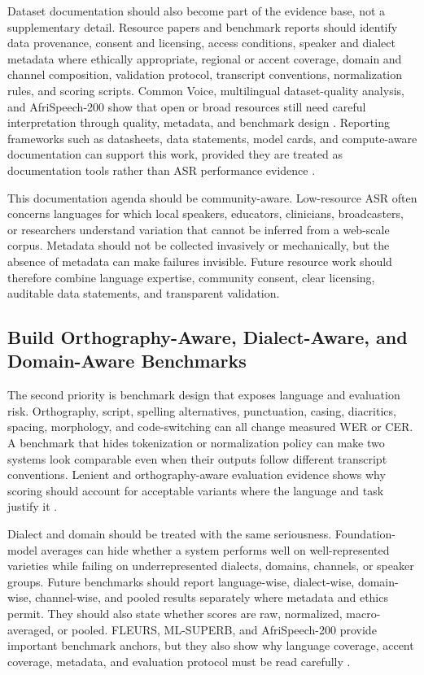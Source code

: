 \documentclass[pdflatex,sn-basic]{sn-jnl}
\theoremstyle{thmstyleone}
\theoremstyle{thmstyletwo}
\theoremstyle{thmstylethree}
\begin{document}
Dataset documentation should also become part of the evidence base, not a supplementary detail. Resource papers and benchmark reports should identify data provenance, consent and licensing, access conditions, speaker and dialect metadata where ethically appropriate, regional or accent coverage, domain and channel composition, validation protocol, transcript conventions, normalization rules, and scoring scripts. Common Voice, multilingual dataset-quality analysis, and AfriSpeech-200 show that open or broad resources still need careful interpretation through quality, metadata, and benchmark design \citep{ardila2020commonvoice,lau2025_data_quality_multilingual_speech,olatunji2023_afrispeech200}. Reporting frameworks such as datasheets, data statements, model cards, and compute-aware documentation can support this work, provided they are treated as documentation tools rather than ASR performance evidence \citep{gebru2021_datasheets_for_datasets,bender2018_data_statements,mitchell2019_model_cards,strubell2019_energy_policy}.

This documentation agenda should be community-aware. Low-resource ASR often concerns languages for which local speakers, educators, clinicians, broadcasters, or researchers understand variation that cannot be inferred from a web-scale corpus. Metadata should not be collected invasively or mechanically, but the absence of metadata can make failures invisible. Future resource work should therefore combine language expertise, community consent, clear licensing, auditable data statements, and transparent validation.

\subsection{Build Orthography-Aware, Dialect-Aware, and Domain-Aware Benchmarks}

The second priority is benchmark design that exposes language and evaluation risk. Orthography, script, spelling alternatives, punctuation, casing, diacritics, spacing, morphology, and code-switching can all change measured WER or CER. A benchmark that hides tokenization or normalization policy can make two systems look comparable even when their outputs follow different transcript conventions. Lenient and orthography-aware evaluation evidence shows why scoring should account for acceptable variants where the language and task justify it \citep{karita2023lenient}.

Dialect and domain should be treated with the same seriousness. Foundation-model averages can hide whether a system performs well on well-represented varieties while failing on underrepresented dialects, domains, channels, or speaker groups. Future benchmarks should report language-wise, dialect-wise, domain-wise, channel-wise, and pooled results separately where metadata and ethics permit. They should also state whether scores are raw, normalized, macro-averaged, or pooled. FLEURS, ML-SUPERB, and AfriSpeech-200 provide important benchmark anchors, but they also show why language coverage, accent coverage, metadata, and evaluation protocol must be read carefully \citep{conneau2022fleurs,shi2023mlsuperb,olatunji2023_afrispeech200}.
\end{document}
